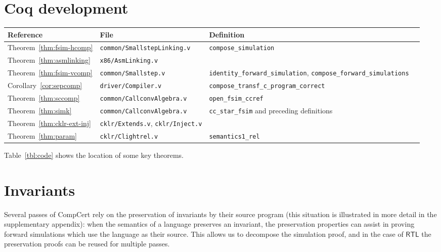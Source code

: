 \documentclass[sigplan,screen]{acmart}
\newcommand{\kw}[1]{\ensuremath{ \mathsf{#1} }}
\newenvironment{optional}{}{}
\begin{document}
\begin{optional}

\section{Coq development} \label{sec:details} %

\begin{table*} %
  \begin{tabular}{llll}
  \hline
  Reference & File & Definition
  \\
  \hline
  Theorem~\ref{thm:fsim-hcomp} &
    \texttt{common/SmallstepLinking.v} &
    \texttt{compose\_simulation}
  \\
  Theorem~\ref{thm:asmlinking} &
    \texttt{x86/AsmLinking.v} &
  \\
  Theorem~\ref{thm:fsim-vcomp} &
    \texttt{common/Smallstep.v} &
    \texttt{identity\_forward\_simulation},
    \texttt{compose\_forward\_simulations}
  \\
  Corollary~\ref{cor:sepcomp} &
    \texttt{driver/Compiler.v} &
    \texttt{compose\_transf\_c\_program\_correct}
  \\
  Theorem~\ref{thm:sccomp} &
    \texttt{common/CallconvAlgebra.v} &
    \texttt{open\_fsim\_ccref}
  \\
  Theorem~\ref{thm:simk} &
    \texttt{common/CallconvAlgebra.v} &
    \texttt{cc\_star\_fsim} and preceding definitions
  \\
  Theorem~\ref{thm:cklr-ext-inj} &
    \texttt{cklr/Extends.v}, \texttt{cklr/Inject.v}
  \\
  Theorem~\ref{thm:param} &
    \texttt{cklr/Clightrel.v} &
    \texttt{semantics1\_rel}
  \\
  \hline
  \end{tabular}
  \caption{Some proofs included in the Coq development.}
  \label{tbl:code}
\end{table*}

Table~\ref{tbl:code}
shows the location of some key theorems.


\section{Invariants} \label{sec:inv} %


Several passes of CompCert
rely on the preservation of invariants
by their source program
(this situation is illustrated in more detail in the supplementary
appendix):
when the semantics of a language preserves an invariant,
the preservation properties can assist
in proving forward simulations
which use the language as their source.
This allows us to decompose the simulation proof,
and in the case of $\kw{RTL}$
the preservation proofs can be reused for multiple passes.


\end{optional}
\end{document}
